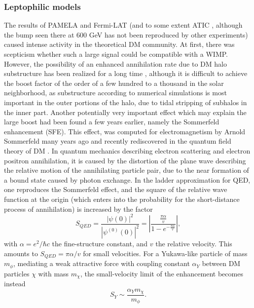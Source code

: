 \documentclass[10pt,aps,pra,reprint,amsmath,amsfonts,amssymb,showpacs,nofootinbib,floatfix]{revtex4-1}
\begin{document}
\subsubsection{Leptophilic models}
\label{sect:LP}
The results of PAMELA \cite{Adriani:2008zr} and Fermi-LAT
\cite{Abdo:2009zk} (and to some extent ATIC
\cite{2008Natur.456..362C}, although the bump seen there at 600 GeV
has not been reproduced by other experiments) caused intense
activity in the theoretical DM community. At first, there was
scepticism whether such a large signal could be compatible with a
WIMP. However, the possibility of an enhanced annihilation rate due to
DM halo substructure has been realized for a long time
\cite{1993ApJ...411..439S,Bergstrom:1998zs,Moore:1999nt}, although it
is difficult to achieve the boost factor of the order of a few hundred
to a thousand in the solar neighborhood, as substructure according to
numerical simulations is most important in the outer portions of the
halo, due to tidal stripping of subhalos in the inner part. Another
potentially very important effect which may explain the large boost
had been found a few years earlier, namely the Sommerfeld enhancement
(SFE). This effect, was computed for electromagnetism by Arnold
Sommerfeld many years ago \cite{sommerfeld} and recently rediscovered
in the quantum field theory of DM
\cite{2005PhRvD..71f3528H,2007NuPhB.787..152C,2009PhRvD..79a5014A}.
In quantum mechanics describing electron scattering and electron
positron annihilation, it is caused by the distortion of the plane
wave describing the relative motion of the annihilating particle pair,
due to the near formation of a bound state caused by photon
exchange. In the ladder approximation for QED, one reproduces the
Sommerfeld effect, and the square of the relative wave function at the
origin (which enters into the probability for the short-distance
process of annihilation) is increased by the factor
\cite{2009PhRvD..79a5014A}
\begin{equation}
S_{QED}=\frac{|\psi(0)|^2}{|\psi^{(0)}(0)|^2}=
\left|\frac{\frac{\pi\alpha}{v}}{1-e^{-\frac{\pi\alpha}{v}}}\right|,
\end{equation}
with $\alpha =e^2/\hbar c$ the fine-structure constant, and $v$ the relative
velocity. This amounts to $S_{QED}=\pi\alpha/v$ for small velocities. For a
Yukawa-like particle of mass $m_\phi$, mediating a weak attractive force with
coupling constant $\alpha_Y$ between DM particles $\chi$ with mass
$m_\chi$, the small-velocity limit of the enhancement becomes instead
\begin{equation}
S_Y\sim\frac{\alpha_Y m_\chi}{m_\phi}.
\label{eq:saturation}
\end{equation}
\end{document}
